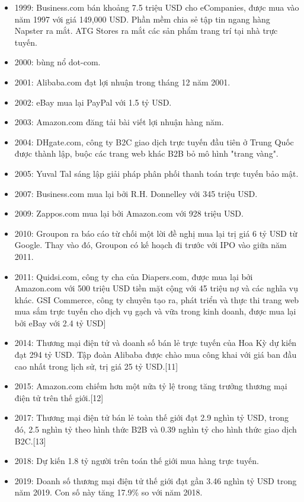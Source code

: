 \documentclass[12pt]{article}
\begin{document}
\begin{itemize}
\item 1999: Business.com bán khoảng 7.5 triệu USD cho eCompanies, được mua vào năm 1997 với giá 149,000 USD. Phần mềm chia sẻ tập tin ngang hàng Napster ra mắt. ATG Stores ra mắt các sản phẩm trang trí tại nhà trực tuyến.
\item 2000: bùng nổ dot-com.
\item 2001: Alibaba.com đạt lợi nhuận trong tháng 12 năm 2001.
\item 2002: eBay mua lại PayPal với 1.5 tỷ USD.
\item 2003: Amazon.com đăng tải bài viết lợi nhuận hàng năm.
\item 2004: DHgate.com, công ty B2C giao dịch trực tuyến đầu tiên ở Trung Quốc được thành lập, buộc các trang web khác B2B bỏ mô hình "trang vàng".
\item 2005: Yuval Tal sáng lập giải pháp phân phối thanh toán trực tuyến bảo mật.
\item 2007: Business.com mua lại bởi R.H. Donnelley với 345 triệu USD.
\item 2009: Zappos.com mua lại bởi Amazon.com với 928 triệu USD.
\item 2010: Groupon ra báo cáo từ chối một lời đề nghị mua lại trị giá 6 tỷ USD từ Google. Thay vào đó, Groupon có kế hoạch đi trước với IPO vào giữa năm 2011.
\item 2011: Quidsi.com, công ty cha của Diapers.com, được mua lại bởi Amazon.com với 500 triệu USD tiền mặt cộng với 45 triệu nợ và các nghĩa vụ khác. GSI Commerce, công ty chuyên tạo ra, phát triển và thực thi trang web mua sắm trực tuyến cho dịch vụ gạch và vữa trong kinh doanh, được mua lại bởi eBay với 2.4 tỷ USD]
\item 2014: Thương mại điện tử và doanh số bán lẻ trực tuyến của Hoa Kỳ dự kiến đạt 294 tỷ USD. Tập đoàn Alibaba được chào mua công khai với giá ban đầu cao nhất trong lịch sử, trị giá 25 tỷ USD.[11]
\item 2015: Amazon.com chiếm hơn một nửa tỷ lệ trong tăng trưởng thương mại điện tử trên thế giới.[12]
\item 2017: Thương mại điện tử bán lẻ toàn thế giới đạt 2.9 nghìn tỷ USD, trong đó, 2.5 nghìn tỷ theo hình thức B2B và 0.39 nghìn tỷ cho hình thức giao dịch B2C.[13]
\item 2018: Dự kiến 1.8 tỷ người trên toán thế giới mua hàng trực tuyến.
\item 2019: Doanh số thương mại điện tử thế giới đạt gần 3.46 nghìn tỷ USD trong năm 2019. Con số này tăng 17.9\% so với năm 2018.
\end{itemize}
\end{document}
